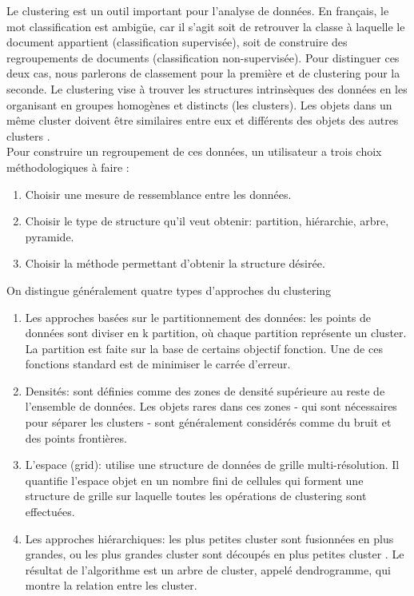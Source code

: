 \documentclass[12pt]{article}
\begin{document}
Le clustering est un outil important pour l'analyse de données. En français, le mot classification est ambigüe, car il s'agit soit de retrouver la classe à laquelle le document appartient (classification supervisée), soit de construire des regroupements de documents (classification non-supervisée). Pour distinguer ces deux cas, nous parlerons de classement pour la première et de clustering pour la seconde. Le clustering vise à trouver les structures intrinsèques des données en les organisant en groupes homogènes et distincts (les clusters). Les objets dans un même cluster doivent être similaires entre eux et différents des objets des autres clusters \cite{3}.\\
Pour construire un regroupement de ces données, un utilisateur a trois choix méthodologiques à faire :
\begin{enumerate}
	\item Choisir une mesure de ressemblance entre les données.
	\item Choisir le type de structure qu'il veut obtenir: partition, hiérarchie, arbre, pyramide.
	\item Choisir la méthode permettant d'obtenir la structure désirée.
\end{enumerate}
On distingue généralement quatre types d'approches du clustering \cite{4}
\begin{enumerate}
	\item Les approches basées sur le partitionnement des données: les points de données sont diviser en k partition, où chaque partition représente un cluster. La partition est faite sur la base de certains objectif fonction. Une de ces fonctions standard est de minimiser le carrée d’erreur.
	\item Densités: sont définies comme des zones de densité supérieure au reste de l’ensemble de données. Les objets rares dans ces zones - qui sont nécessaires pour séparer les clusters - sont généralement considérés comme du bruit et des points frontières.	
	\item L'espace (grid): utilise une structure de données de grille multi-résolution. Il quantifie l'espace objet en un nombre fini de cellules qui forment une structure de grille sur laquelle toutes les opérations de clustering sont effectuées.
	\item Les approches hiérarchiques: les plus petites cluster sont fusionnées en plus grandes, ou les plus grandes cluster sont découpés en plus petites cluster . Le résultat de l'algorithme est un arbre de cluster, appelé dendrogramme, qui montre la relation entre les cluster.
\end{enumerate}
\end{document}
